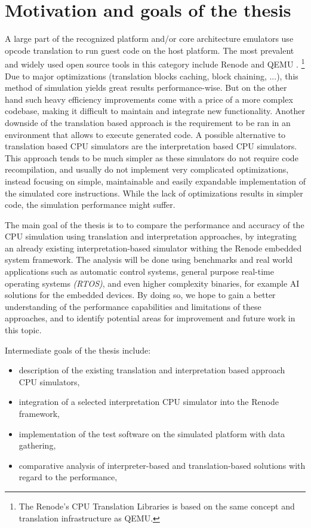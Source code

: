 \section{Motivation and goals of the thesis}

A large part of the recognized platform and/or core architecture emulators use opcode translation to run guest code
on the host platform. The most prevalent and widely used open source tools in this category include Renode \cite{Renode}
and QEMU \cite{Qemu}.%
\footnote{The Renode's CPU Translation Libraries is based on the same concept and translation infrastructure as QEMU.}
Due to major optimizations (translation blocks caching, block chaining, ...), this method of simulation yields
great results performance-wise. But on the other hand such heavy efficiency improvements come with a price 
of a more complex codebase,
making it difficult to maintain and integrate new functionality. Another downside of the
translation based approach is the requirement to be ran in an environment that allows to execute generated code.
A possible alternative to translation based CPU simulators are the interpretation
based CPU simulators. This approach tends to be much simpler as these simulators do not require code recompilation,
and usually do not implement very complicated optimizations, instead focusing on simple, maintainable and easily
expandable implementation of the simulated core instructions. While the lack of optimizations results in simpler
code, the simulation performance might suffer.

The main goal of the thesis is to to compare the performance and accuracy of the CPU simulation using translation
and interpretation approaches, by integrating an already existing interpretation-based simulator withing the Renode
embedded system framework. The analysis will be done using benchmarks and real world applications such as automatic control
systems, general purpose real-time operating systems \textit{(RTOS)}, and even higher complexity binaries, for example AI solutions for the embedded devices.
By doing so, we hope to gain a better understanding of the performance capabilities and limitations of these approaches,
and to identify potential areas for improvement and future work in this topic.

\noindent Intermediate goals of the thesis include:
\begin{itemize}
	\item{description of the existing translation and interpretation based approach CPU simulators,}
	\item{integration of a selected interpretation CPU simulator into the Renode framework,}
	\item{implementation of the test software on the simulated platform with data gathering,}
	\item{comparative analysis of interpreter-based and translation-based solutions with regard to the performance,}
\end{itemize}

